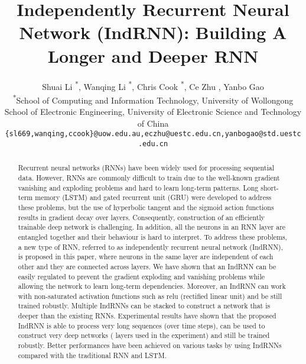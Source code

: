 \documentclass[10pt,twocolumn,letterpaper]{article}
\begin{document}
\title{Independently Recurrent Neural Network (IndRNN): Building A Longer and Deeper RNN}

\author{
  Shuai Li \textsuperscript{*}, Wanqing Li \textsuperscript{*}, Chris Cook \textsuperscript{*}, Ce Zhu \textsuperscript{\dag}, Yanbo Gao \textsuperscript{\dag}\\
\textsuperscript{*}School of Computing and Information Technology, University of Wollongong\\
\textsuperscript{\dag}School of Electronic Engineering, University of Electronic Science and Technology of China\\
  \tt\small {\{sl669,wanqing,ccook\}@uow.edu.au,eczhu@uestc.edu.cn,yanbogao@std.uestc.edu.cn}}

\maketitle



\begin{abstract}
Recurrent neural networks (RNNs) have been widely used for processing sequential data. However, RNNs are commonly difficult to train due to the well-known gradient vanishing and exploding problems and hard to learn long-term patterns. Long short-term memory (LSTM) and gated recurrent unit (GRU) were developed to address these problems, but the use of hyperbolic tangent and the sigmoid action functions results in gradient decay over layers. Consequently, construction of an efficiently trainable deep network is challenging. In addition, all the neurons in an RNN layer are entangled together and their behaviour is hard to interpret. To address these problems, a new type of RNN, referred to as independently recurrent neural network (IndRNN), is proposed in this paper, where neurons in the same layer are independent of each other and they are connected across layers. We have shown that an IndRNN can be easily regulated to prevent the gradient exploding and vanishing problems while allowing the network to learn long-term dependencies. Moreover, an IndRNN can work with non-saturated activation functions such as relu (rectified linear unit) and be still trained robustly. Multiple IndRNNs can be stacked to construct a network that is deeper than the existing RNNs. Experimental results have shown that the proposed IndRNN is able to process very long sequences (over  time steps), can be used to construct very deep networks ( layers used in the experiment) and still be trained robustly. Better performances have been achieved on various tasks by using IndRNNs compared with the traditional RNN and LSTM. {}
\end{abstract}
\end{document}
